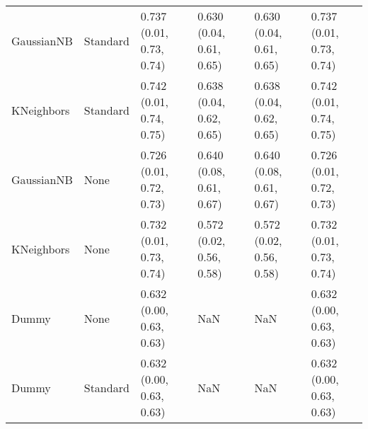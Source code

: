 \begin{tabular}{llllll}
GaussianNB & Standard & 0.737 (0.01, 0.73, 0.74) & 0.630 (0.04, 0.61, 0.65) & 0.630 (0.04, 0.61, 0.65) & 0.737 (0.01, 0.73, 0.74) \\
KNeighbors & Standard & 0.742 (0.01, 0.74, 0.75) & 0.638 (0.04, 0.62, 0.65) & 0.638 (0.04, 0.62, 0.65) & 0.742 (0.01, 0.74, 0.75) \\
GaussianNB & None & 0.726 (0.01, 0.72, 0.73) & 0.640 (0.08, 0.61, 0.67) & 0.640 (0.08, 0.61, 0.67) & 0.726 (0.01, 0.72, 0.73) \\
KNeighbors & None & 0.732 (0.01, 0.73, 0.74) & 0.572 (0.02, 0.56, 0.58) & 0.572 (0.02, 0.56, 0.58) & 0.732 (0.01, 0.73, 0.74) \\
Dummy & None & 0.632 (0.00, 0.63, 0.63) & NaN & NaN & 0.632 (0.00, 0.63, 0.63) \\
Dummy & Standard & 0.632 (0.00, 0.63, 0.63) & NaN & NaN & 0.632 (0.00, 0.63, 0.63) \\
\bottomrule
\end{tabular}
